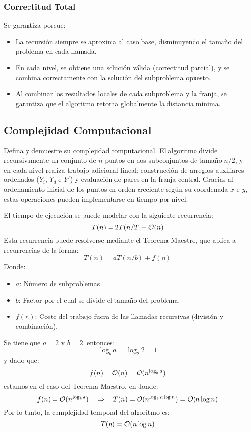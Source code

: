 \documentclass[informe.tex]{subfiles}
\begin{document}
\subsubsection{\textbf{Correctitud Total}}
Se garantiza porque:

\begin{itemize}
	\item La recursión siempre se aproxima al caso base, disminuyendo el tamaño del problema en cada llamada.

	\item En cada nivel, se obtiene una solución válida (correctitud parcial), y se combina correctamente
	      con la solución del subproblema opuesto.

	\item Al combinar los resultados locales de cada subproblema y la franja, se garantiza que el algoritmo
	      retorna globalmente la distancia mínima.
\end{itemize}

\subsection{Complejidad Computacional}
Defina y demuestre su complejidad computacional.
El algoritmo divide recursivamente un conjunto de $n$ puntos en dos subconjuntos de tamaño $n/2$,
y en cada nivel realiza trabajo adicional lineal: construcción de arreglos auxiliares ordenados
($Y_i$, $Y_d$ e $Y'$)  y evaluación de pares en la franja central. Gracias al ordenamiento inicial
de los puntos en orden creciente según su coordenada $x$ e $y$, estas operaciones pueden implementarse en tiempo  por nivel.

El tiempo de ejecución se puede modelar con la siguiente recurrencia:
\[
	T(n) = 2T(n/2) + \mathcal{O}(n)
\]
Esta recurrencia puede resolverse mediante el Teorema Maestro, que aplica a recurrencias de la forma:
\[
	T(n) = aT(n/b) + f(n)
\]
Donde:
\begin{itemize}
	\item $a$: Número de subproblemas
	\item $b$: Factor por el cual se divide el tamaño del problema.
	\item $f(n)$: Costo del trabajo fuera de las llamadas recursivas (división y combinación).
\end{itemize}

Se tiene que $a = 2$ y $b = 2$, entonces:
\[
	\log_b{a} = \log_2{2} = 1
\]
y dado que:
\[
	f(n) = \mathcal{O}(n) = \mathcal{O}(n^{\log_b{a}})
\]
estamos en el caso del Teorema Maestro, en donde:
\[
	f(n) = \mathcal{O}(n^{\log_b{a}})
	\quad \Rightarrow \quad
	T(n) = \mathcal{O}(n^{\log_b{a} \log{n}}) = \mathcal{O}(n \log{n})
\]
Por lo tanto, la complejidad temporal del algoritmo es:
\[
	T(n) = \mathcal{O}(n \log{n})
\]
\end{document}
